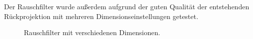 \documentclass[slug=PET, room=Andreas-Schubert-Bau\,\ 424A, supervisor=Carsten\ Bittrich, coursedate=10.\ 01.\ 2020]{../../Lab_Report_LaTeX/lab_report}
\begin{document}

Der Rauschfilter wurde außerdem aufgrund der guten Qualit\"at der
entstehenden R\"uckprojektion mit mehreren Dimensionseinstellungen getestet.

\begin{figure}[h!]
	\centering
	\caption{Rauschfilter mit verschiedenen Dimensionen.}
	\label{fig:rausch}
\end{figure}
\end{document}
